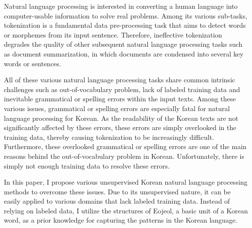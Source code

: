 \documentclass[oneside, ko,phd]{snuthesis_utf8_kor}
\begin{document}
\begin{abstractalt}
Natural language processing is interested in converting a human language into computer-usable information to solve real problems.
Among its various sub-tasks, tokenization is a fundamental data pre-processing task that aims to detect words or morphemes from its input sentence.
Therefore, ineffective tokenization degrades the quality of other subsequent natural language processing tasks such as document summarization, in which documents are condensed into several key words or sentences.

All of these various natural language processing tasks share common intrinsic challenges such as out-of-vocabulary problem, lack of labeled training data and inevitable grammatical or spelling errors within the input texts.
Among these various issues, grammatical or spelling errors are especially fatal for natural language processing for Korean.
As the readability of the Korean texts are not significantly affected by these errors, these errors are simply overlooked in the training data, thereby causing tokenization to be increasingly difficult.
Furthermore, these overlooked grammatical or spelling errors are one of the main reasons behind the out-of-vocabulary problem in Korean.
Unfortunately, there is simply not enough training data to resolve these errors.

In this paper, I propose various unsupervised Korean natural language processing methods to overcome these issues.
Due to its unsupervised nature, it can be easily applied to various domains that lack labeled training data.
Instead of relying on labeled data, I utilize the structures of Eojeol, a basic unit of a Korean word, as a prior knowledge for capturing the patterns in the Korean language.


\end{abstractalt}
\end{document}
